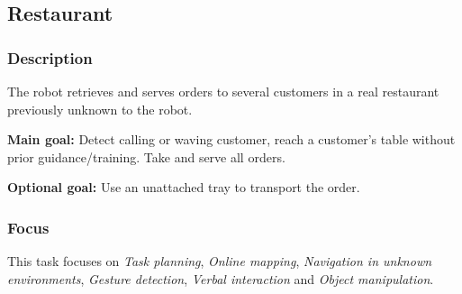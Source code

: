 \subsection{Restaurant}
\label{test:restaurant}

\subsubsection*{Description}

The robot retrieves and serves orders to several customers in a real restaurant previously unknown to the robot.

\textbf{Main goal:}
	Detect calling or waving customer, reach a customer's table without prior guidance/training. Take and serve all orders.
	
\textbf{Optional goal:}
	Use an unattached tray to transport the order.


\subsubsection*{Focus}
This task focuses on
\textit{Task planning},
\textit{Online mapping},
\textit{Navigation in unknown environments},
\textit{Gesture detection},
\textit{Verbal interaction} and
\textit{Object manipulation}.	

